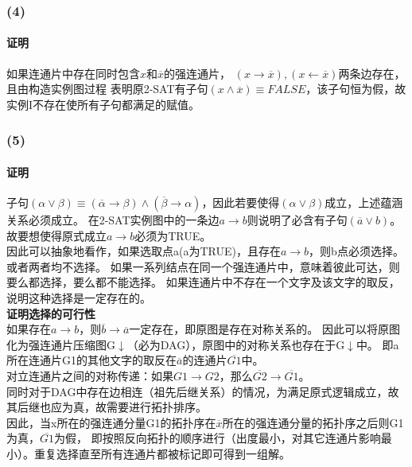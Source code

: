 \documentclass[11pt,a4paper,oneside,oldfontcommands]{ctexart}
\begin{document}
\subsubsection*{(4)}
\paragraph{证明}
如果连通片中存在同时包含$x$和$\overline{x}$的强连通片，
$(x\rightarrow \overline{x}),(x\leftarrow \overline{x})$两条边存在，
且由构造实例图过程
表明原2-SAT有子句$(x\wedge\overline{x})\equiv FALSE$，该子句恒为假，故实例I不存在使所有子句都满足的赋值。
\subsubsection*{(5)}
\paragraph{证明}
子句$(\alpha\vee\beta)\equiv (\overline{\alpha}\rightarrow \beta)
	\wedge(\overline{\beta }\rightarrow \alpha)$，因此若要使得$(\alpha\vee\beta)$成立，上述蕴涵关系必须成立。
在2-SAT实例图中的一条边$a\rightarrow b$则说明了必含有子句$(\overline{a}\vee b)$。故要想使得原式成立$a\rightarrow b$必须为TRUE。\\
\hspace*{20pt}因此可以抽象地看作，如果选取点a(a为TRUE)，且存在$a\rightarrow b$，则b点必须选择。或者两者均不选择。
如果一系列结点在同一个强连通片中，意味着彼此可达，则要么都选择，要么都不能选择。
如果连通片中不存在一个文字及该文字的取反，说明这种选择是一定存在的。\\
\textbf{证明选择的可行性}\\
\hspace*{20pt}如果存在$a\rightarrow b$，则$\overline{b}\rightarrow\overline{a}$一定存在，即原图是存在对称关系的。
\hspace*{20pt}因此可以将原图化为强连通片压缩图G$\downarrow$（必为DAG），原图中的对称关系也存在于G$\downarrow$中。
即a所在连通片G1的其他文字的取反在$\overline{a}$的连通片$\overline{G1}$中。\\
\hspace*{20pt}对立连通片之间的对称传递：如果$G1\rightarrow G2$，那么$\overline{G2}\rightarrow \overline{G1}$。\\
\hspace*{20pt}同时对于DAG中存在边相连（祖先后继关系）的情况，为满足原式逻辑成立，故其后继也应为真，故需要进行拓扑排序。\\
\hspace*{20pt}因此，当x所在的强连通分量G1的拓扑序在$\overline{x}$所在的强连通分量的拓扑序之后则G1为真，$\overline{G1}$为假，
即按照反向拓扑的顺序进行（出度最小，对其它连通片影响最小）。重复选择直至所有连通片都被标记即可得到一组解。
\end{document}
